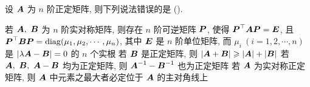 \begin{example}
    设 $\vb*{A}$ 为 $n$ 阶正定矩阵, 则下列说法错误的是 (\quad).
    \begin{tasks}
        \task 若 $\vb*{A},~\vb*{B}$ 为 $n$ 阶实对称矩阵, 则存在 $n$ 阶可逆矩阵 $\vb*{P}$, 使得 $\vb*{P}^\top\vb*{AP}=\vb*{E}$, 且 $\vb*{P}^\top\vb*{BP}=\operatorname{diag} (\mu_1, \mu_2, \cdots, \mu_n)$, 其中 $\vb*{E}$ 是 $n$ 阶单位矩阵, 而 $\mu_i~(i=1,2, \cdots, n)$ 是 $|\lambda\vb*{A}-\vb*{B}|=0$ 的 $n$ 个实根
        \task 若 $\vb*{B}$ 是正定矩阵, 则 $|\vb*{A}+\vb*{B}|\geqslant|\vb*{A}|+|\vb*{B}|$
        \task 若 $\vb*{A},~\vb*{B},~\vb*{A}-\vb*{B}$ 均为正定矩阵, 则 $\vb*{A}^{-1}-\vb*{B}^{-1}$ 也为正定矩阵
        \task 若 $\vb*{A}$ 为实对称正定矩阵, 则 $\vb*{A}$ 中元素之最大者必定位于 $\vb*{A}$ 的主对角线上
    \end{tasks}
\end{example}
